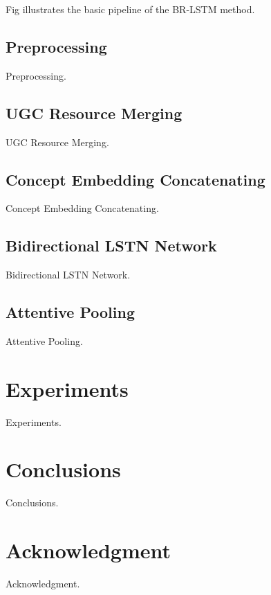 \documentclass[conference]{IEEEtran}
\begin{document}
Fig illustrates the basic pipeline of the BR-LSTM method.

\subsection{Preprocessing}
Preprocessing.

\subsection{UGC Resource Merging}
UGC Resource Merging.

\subsection{Concept Embedding Concatenating}
Concept Embedding Concatenating.

\subsection{Bidirectional LSTN Network}
Bidirectional LSTN Network.

\subsection{Attentive Pooling}
Attentive Pooling.

\section{Experiments}
Experiments.

\section{Conclusions}
Conclusions.

\section*{Acknowledgment}
Acknowledgment.



\end{document}
